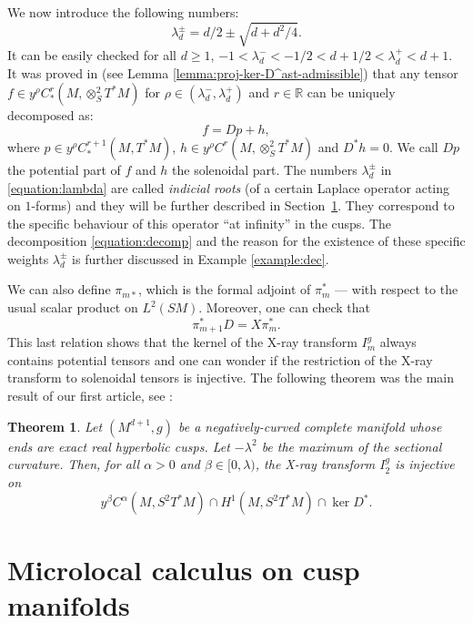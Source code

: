 \documentclass[10pt]{amsart}
\newcommand{\R}{\mathbb{R}}
\theoremstyle{plain}
\newtheorem{theorem}{Theorem}[section]
\theoremstyle{definition}
\begin{document}
We now introduce the following numbers:
\begin{equation}
\label{equation:lambda}
\lambda_d^\pm = d/2 \pm \sqrt{d+d^2/4}.
\end{equation}
It can be easily checked for all $d \geq 1$, $-1 < \lambda_d^- < -1/2 < d+1/2 <\lambda_d^+ < d+1$. It was proved in \cite[Lem.\,5.5]{Bonthonneau-Lefeuvre-19-1} (see Lemma \ref{lemma:proj-ker-D^ast-admissible}) that any tensor $f \in y^\rho C^r_*(M,\otimes^2_S T^*M)$ for $\rho \in (\lambda_d^-, \lambda_d^+)$ and $r \in \R$ can be uniquely decomposed as:
\begin{equation}
\label{equation:decomp}
f = Dp + h,
\end{equation}
where $p \in y^\rho C^{r+1}_*(M, T^*M)$, $h \in y^\rho C^r(M,\otimes^2_S T^*M)$ and $D^*h = 0$. We call $Dp$ the potential part of $f$ and $h$ the solenoidal part. The numbers $\lambda_d^\pm$ in \eqref{equation:lambda} are called \emph{indicial roots} (of a certain Laplace operator acting on $1$-forms) and they will be further described in Section~\ref{sec:microlocal-cusp}. They correspond to the specific behaviour of this operator ``at infinity'' in the cusps. The decomposition \eqref{equation:decomp} and the reason for the existence of these specific weights $\lambda_d^\pm$ is further discussed in Example \ref{example:dec}.

We can also define $\pi_{m\ast}$, which is the formal adjoint of $\pi_m^\ast$ --- with respect to the usual scalar product on $L^2(SM)$. Moreover, one can check that
\[
\pi^\ast_{m+1} D = X\pi^\ast_m.
\]
This last relation shows that the kernel of the X-ray transform $I^g_m$ always contains potential tensors and one can wonder if the restriction of the X-ray transform to solenoidal tensors is injective. The following theorem was the main result of our first article, see \cite[Th.\,1]{Bonthonneau-Lefeuvre-19-1}:
\begin{theorem}
\label{theorem:xray-injectivite}
Let $(M^{d+1},g)$ be a negatively-curved complete manifold whose ends are exact real hyperbolic cusps. Let $-\lambda^2$ be the maximum of the sectional curvature. Then, for all $\alpha > 0$ and $\beta \in [0,\lambda)$, the X-ray transform $I^{g}_2$ is injective on
\[
y^\beta C^\alpha(M, S^2 T^*M) \cap H^1(M, S^2 T^*M) \cap \ker D^*.
\]
\end{theorem}

\section{Microlocal calculus on cusp manifolds}
\label{sec:microlocal-cusp}
\end{document}
